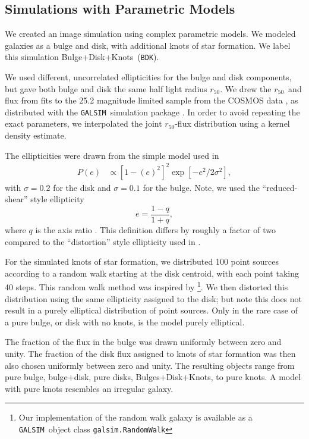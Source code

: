 \documentclass[iop]{emulateapj}
\newcommand{\hlr}{$r_{50}$}
\newcommand{\bdkfull}{Bulge+Disk+Knots}
\newcommand{\bdksim}{\texttt{BDK}}
\newcommand{\galsim}{\texttt{GALSIM}}
\begin{document}
\subsection{Simulations with Parametric Models} \label{sec:bdksim}

We created an image simulation using complex parametric models.  We modeled
galaxies as a bulge and disk, with additional knots of star formation.  We
label this simulation \bdkfull\ (\bdksim).

We used different, uncorrelated ellipticities for the bulge and disk
components, but gave both bulge and disk the same half light radius \hlr.
We drew the \hlr\ and flux from fits \citep{LacknerGunn2012} to the 25.2
magnitude limited sample from the COSMOS data
\citep{Scoville2007a,Scoville2007b}, as distributed with the \galsim\
simulation package \citep{GALSIM2015}.  In order to avoid repeating the exact
parameters, we interpolated the joint \hlr-flux distribution using a kernel
density estimate.

The ellipticities were drawn from the simple model used in \cite{bfd2016}
\begin{align} \label{eq:edist}
    P(e) &\propto \left[1-(e)^2\right]^2 \exp\left[-e^2/2\sigma^2\right],
\end{align}
with $\sigma=0.2$ for the disk and $\sigma=0.1$ for the bulge.  Note, we used
the ``reduced-shear'' style ellipticity
\begin{equation}
    e = \frac{1-q}{1+q},
\end{equation}
where $q$ is the axis ratio \citep{bj02}.  This definition differs by roughly a
factor of two compared to the ``distortion'' style ellipticity
used in \citet{bfd2016}.

For the simulated knots of star formation, we distributed 100 point sources
according to a random walk starting at the disk centroid, with each point
taking 40 steps.  This random walk method was inspired by
\cite{Zhang2008FourierQuadI}\footnote{Our implementation
of the random walk galaxy is available as a \galsim\ object class \texttt{galsim.RandomWalk}}.
We then distorted this distribution using the same ellipticity assigned to the
disk; but note this does not result in a purely elliptical distribution of
point sources.  Only in the rare case of a pure bulge, or disk with no knots,
is the model purely elliptical.

The fraction of the flux in the bulge was drawn uniformly between zero and
unity.  The fraction of the disk flux assigned to knots of star formation
was then also chosen uniformly between zero and unity.  The resulting 
objects range from pure bulge, bulge+disk, pure disks, Bulges+Disk+Knots, 
to pure knots. A model with pure knots resembles an irregular galaxy.
\end{document}

